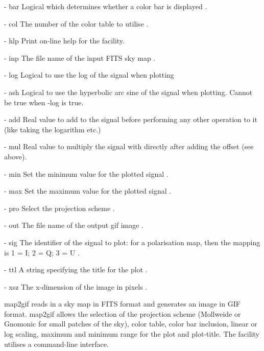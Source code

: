 \begin{qualifiers}
  \begin{qulist}{} %
    \item[{- bar}] Logical which determines whether a color bar is
      displayed . 
    \item[{- col}] The number of the color table to utilise .
    \item[{- hlp}] Print on-line help for the facility.
    \item[{- inp}] The file name of the input FITS sky map \nodefault.
    \item[{- log}] Logical to use the log of the signal when plotting 
    \item[{- ash}] Logical to use the hyperbolic arc sine of the signal when
      plotting. Cannot be true when -log is true.
    \item[{- add}] Real value to add to the signal before performing any
      other operation to it (like taking the logarithm etc.)
    \item[{- mul}] Real value to multiply the signal with directly after
      adding the offset (see above).
    \item[{- min}] Set the minimum value for the plotted signal
    .
    \item[{- max}] Set the maximum value for the plotted signal
      .
    \item[{- pro}] Select the projection scheme .
    \item[{- out}] The file name of the output gif image \nodefault.
    \item[{- sig}] The identifier of the signal to plot: for a
      polarisation map, then the mapping is 1 = I; 2 = Q; 3 = U
      .
    \item[{- ttl}] A string specifying the title for the plot \nodefault.
    \item[{- xsz}] The x-dimension of the image in pixels .
  \end{qulist}
\end{qualifiers}

\begin{codedescription}
{map2gif reads in a \healpix sky map in FITS format and generates an
image in GIF format. map2gif allows the selection of the projection
scheme (Mollweide or Gnomonic for small patches of the sky), color
table, color bar inclusion, linear or log scaling, maximum and 
minimum range for the plot and plot-title. The facility utilises
a command-line interface.}
\end{codedescription}

